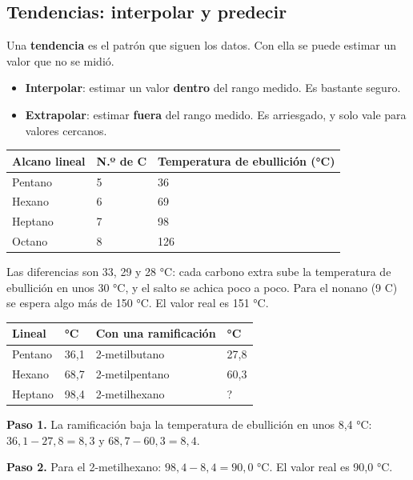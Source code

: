 \subsection{Tendencias: interpolar y predecir}
Una \textbf{tendencia} es el patrón que siguen los datos. Con ella se puede estimar un valor que no se midió.

 
\begin{itemize}
  \item \textbf{Interpolar}: estimar un valor \textbf{dentro} del rango medido. Es bastante seguro.
  \item \textbf{Extrapolar}: estimar \textbf{fuera} del rango medido. Es arriesgado, y solo vale para valores cercanos.
\end{itemize}
 
\begin{center}\small
\begin{tabular}{@{}lll@{}}
\toprule
\textbf{Alcano lineal} & \textbf{N.º de C} & \textbf{Temperatura de ebullición (°C)} \\
\midrule
Pentano & 5 & 36 \\
Hexano & 6 & 69 \\
Heptano & 7 & 98 \\
Octano & 8 & 126 \\
\bottomrule
\end{tabular}
\end{center}
 

Las diferencias son 33, 29 y 28 °C: cada carbono extra sube la temperatura de ebullición en unos 30 °C, y el salto se achica poco a poco. Para el nonano (9 C) se espera algo más de 150 °C. El valor real es 151 °C.

  
\begin{ejemplo} \begin{center}\small
\begin{tabular}{@{}llll@{}}
\toprule
\textbf{Lineal} & \textbf{°C} & \textbf{Con una ramificación} & \textbf{°C} \\
\midrule
Pentano & 36,1 & 2-metilbutano & 27,8 \\
Hexano & 68,7 & 2-metilpentano & 60,3 \\
Heptano & 98,4 & 2-metilhexano & ? \\
\bottomrule
\end{tabular}
\end{center}
\textbf{Paso 1.} La ramificación baja la temperatura de ebullición en unos 8,4 °C: $36{,}1 - 27{,}8 = 8{,}3$ y $68{,}7 - 60{,}3 = 8{,}4$.\par \textbf{Paso 2.} Para el 2-metilhexano: $98{,}4 - 8{,}4 = 90{,}0$ °C. El valor real es 90,0 °C.\end{ejemplo}
 
